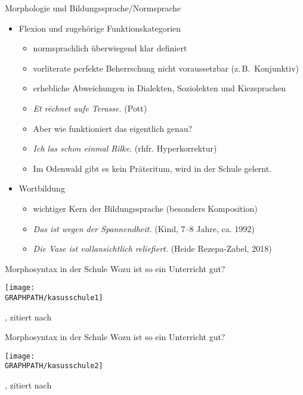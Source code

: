 \begin{frame}
  {Morphologie und Bildungssprache\slash Normsprache}
  \pause
  \begin{itemize}[<+->]
    \item Flexion und zugehörige Funktionskategorien
      \begin{itemize}[<+->]
        \item normsprachlich überwiegend \alert{klar definiert}
        \item vorliterate perfekte Beherrschung nicht voraussetzbar (z.\,B.\ Konjunktiv)
          \Halbzeile
        \item erhebliche Abweichungen in \alert{Dialekten}, \alert{Soziolekten} und \alert{Kiezsprachen}
          \Halbzeile
        \item \textit{Et rēchnet aufe Terasse.} (Pott)
        \item Aber wie funktioniert das eigentlich genau?
          \Halbzeile
        \item \textit{Ich las schon einmal Rilke.} (rhfr. Hyperkorrektur)
        \item Im Odenwald gibt es kein Präteritum, wird in der Schule gelernt.
      \end{itemize}
     \Halbzeile 
    \item Wortbildung
      \begin{itemize}[<+->]
        \item wichtiger Kern der Bildungssprache (besonders Komposition)
          \Halbzeile
        \item \textit{Das ist wegen der Spannendheit.} (Kind, 7--8 Jahre, ca. 1992)
        \item \textit{Die Vase ist vollansichtlich reliefiert.} (Heide Rezepa-Zabel, 2018)
      \end{itemize}
  \end{itemize}
\end{frame}

\begin{frame}
  {Morphosyntax in der Schule}
  \pause
  Wozu ist so ein Unterricht gut?
  \pause
  \begin{center}
    \texttt{[image: \\GRAPHPATH/kasusschule1]}
  \end{center}
  \tiny \citet[36--37]{Gramzowemden2002}, zitiert nach \citet[257--258]{Bredel2013}
\end{frame}

\begin{frame}
  {Morphosyntax in der Schule}
  Wozu ist so ein Unterricht gut?
  \begin{center}
    \texttt{[image: \\GRAPHPATH/kasusschule2]}
  \end{center}
  \tiny \citet[36--37]{Gramzowemden2002}, zitiert nach \citet[257--258]{Bredel2013}
\end{frame}

